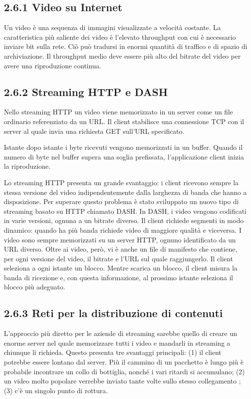 \documentclass{book}
\begin{document}
\subsection*{2.6.1 Video su Internet}
Un video è una sequenza di immagini visualizzate a velocità costante. La caratteristica più saliente dei video è l'elevato throughput con cui è necessario inviare bit sulla rete. Ciò può tradursi in enormi quantità di traffico e di spazio di archiviazione. Il throughput medio deve essere più alto del bitrate del video per avere una riproduzione continua.

\subsection*{2.6.2 Streaming HTTP e DASH}
Nello streaming HTTP un video viene  memorizzato in un server come un file ordinario referenziato da un URL. Il client stabilisce una connessione TCP con il server al quale invia una richiesta GET sull'URL specificato.

Istante dopo istante i byte ricevuti vengono memorizzati in un buffer. Quando il numero di byte nel buffer supera una soglia prefissata, l'applicazione client inizia la riproduzione.

Lo streaming HTTP presenta un grande svantaggio: i client ricevono sempre la stessa versione del video indipendentemente dalla larghezza di banda che hanno a disposizione. Per superare questo problema è stato sviluppato un nuovo tipo di streaming basato su HTTP chiamato DASH. In DASH, i video vengono codificati in varie versioni, ognuna a un bitrate diverso. Il client richiede segmenti in modo dinamico: quando ha più banda richiede video di maggiore qualità e viceversa. I video sono sempre memorizzati su un server HTTP, ognuno identificato da un URL diverso. Oltre ai video, però, vi è anche un file di manifesto che contiene, per ogni versione del video, il bitrate e l'URL sul quale raggiungerlo. Il client seleziona a ogni istante un blocco. Mentre scarica un blocco, il client misura la banda di ricezione e, con questa informazione, al prossimo istante seleziona il blocco più adeguato.

\subsection*{2.6.3 Reti per la distribuzione di contenuti}
L'approccio più diretto per le aziende di streaming sarebbe quello di creare un enorme server nel quale memorizzare tutti i video e mandarli in streaming a chiunque li richieda. Questo presenta tre svantaggi principali: (1) il client potrebbe essere lontano dal server. Più il cammino di un pacchetto è lungo più è probabile incontrare un collo di bottiglia, nonché i vari ritardi si accumulano; (2) un video molto popolare verrebbe inviato tante volte sullo stesso collegamento ; (3) c'è un singolo punto di rottura.
\end{document}
